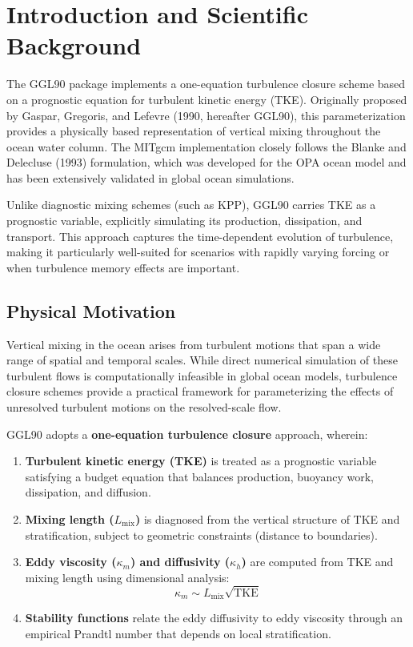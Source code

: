 \documentclass[12pt,letterpaper]{article}
\newcommand{\TKE}{\mathrm{TKE}}
\newcommand{\KM}{\kappa_m}
\newcommand{\KH}{\kappa_h}
\newcommand{\Lmix}{L_{\mathrm{mix}}}
\begin{document}
\section{Introduction and Scientific Background}

The GGL90 package implements a one-equation turbulence closure scheme based on
a prognostic equation for turbulent kinetic energy (TKE). Originally proposed by
Gaspar, Gregoris, and Lefevre (1990, hereafter GGL90), this parameterization
provides a physically based representation of vertical mixing throughout the
ocean water column. The MITgcm implementation closely follows the Blanke and
Delecluse (1993) formulation, which was developed for the OPA ocean model and
has been extensively validated in global ocean simulations.

Unlike diagnostic mixing schemes (such as KPP), GGL90 carries TKE as a
prognostic variable, explicitly simulating its production, dissipation, and
transport. This approach captures the time-dependent evolution of turbulence,
making it particularly well-suited for scenarios with rapidly varying forcing
or when turbulence memory effects are important.

\subsection{Physical Motivation}

Vertical mixing in the ocean arises from turbulent motions that span a wide
range of spatial and temporal scales. While direct numerical simulation of
these turbulent flows is computationally infeasible in global ocean models,
turbulence closure schemes provide a practical framework for parameterizing
the effects of unresolved turbulent motions on the resolved-scale flow.

GGL90 adopts a \textbf{one-equation turbulence closure} approach, wherein:

\begin{enumerate}[leftmargin=*, label=\textbf{\arabic*.}]
  \item \textbf{Turbulent kinetic energy (TKE)} is treated as a prognostic
        variable satisfying a budget equation that balances production,
        buoyancy work, dissipation, and diffusion.

  \item \textbf{Mixing length ($\Lmix$)} is diagnosed from the vertical
        structure of TKE and stratification, subject to geometric constraints
        (distance to boundaries).

  \item \textbf{Eddy viscosity ($\KM$) and diffusivity ($\KH$)} are computed
        from TKE and mixing length using dimensional analysis:
        \[
        \KM \sim \Lmix \sqrt{\TKE}
        \]

  \item \textbf{Stability functions} relate the eddy diffusivity to eddy
        viscosity through an empirical Prandtl number that depends on local
        stratification.
\end{enumerate}
\end{document}

